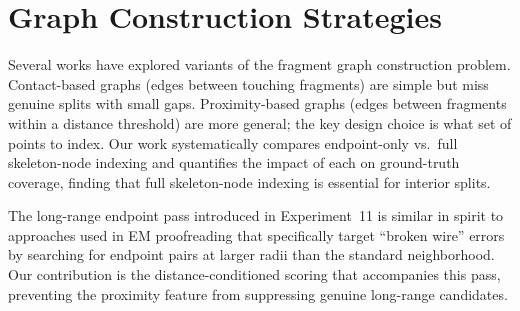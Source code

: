 \section{Graph Construction Strategies}

Several works have explored variants of the fragment graph construction problem.
Contact-based graphs (edges between touching fragments) are simple but miss
genuine splits with small gaps. Proximity-based graphs (edges between fragments
within a distance threshold) are more general; the key design choice is what
set of points to index. Our work systematically compares endpoint-only vs.\
full skeleton-node indexing and quantifies the impact of each on ground-truth coverage,
finding that full skeleton-node indexing is essential for interior splits.

The long-range endpoint pass introduced in Experiment~11 is similar in spirit
to approaches used in EM proofreading that specifically target ``broken wire''
errors by searching for endpoint pairs at larger radii than the standard
neighborhood. Our contribution is the distance-conditioned scoring that
accompanies this pass, preventing the proximity feature from suppressing
genuine long-range candidates.
